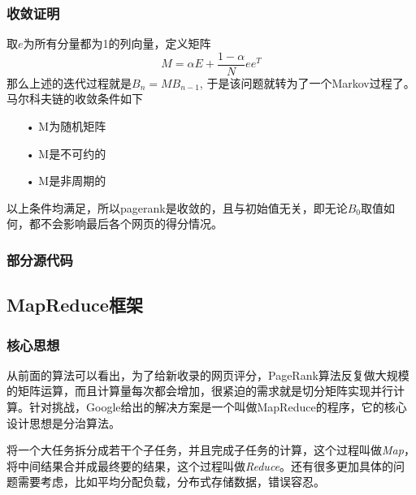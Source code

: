 \documentclass[a4paper, 14pt, twocolumn]{article}
\theoremstyle{definition}
\begin{document}
\subsubsection{收敛证明}
取$e$为所有分量都为1的列向量，定义矩阵
\begin{equation*}
M=\alpha E+\frac{1-\alpha}{N}ee^T
\end{equation*}
那么上述的迭代过程就是$B_n=MB_{n-1}$​, 于是该问题就转为了一个Markov过程了。马尔科夫链的收敛条件如下\cite{Convergence}
\begin{itemize}
\item[•]M为随机矩阵
\item[•]M是不可约的
\item[•]M是非周期的
\end{itemize}
以上条件均满足，所以pagerank是收敛的，且与初始值无关，即无论$B_0$取值如何，都不会影响最后各个网页的得分情况。
\subsubsection{部分源代码}

\subsection{MapReduce框架}
\subsubsection{核心思想}
从前面的算法可以看出，为了给新收录的网页评分，PageRank算法反复做大规模的矩阵运算，而且计算量每次都会增加，很紧迫的需求就是切分矩阵实现并行计算。针对挑战，Google给出的解决方案是一个叫做MapReduce的程序，它的核心设计思想是分治算法。\cite{Math}

将一个大任务拆分成若干个子任务，并且完成子任务的计算，这个过程叫做\textit{Map}，将中间结果合并成最终要的结果，这个过程叫做\textit{Reduce}。还有很多更加具体的问题需要考虑，比如平均分配负载，分布式存储数据，错误容忍。\cite{MapReduce}
\end{document}
